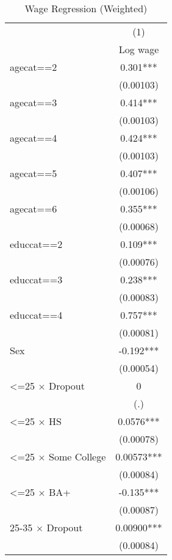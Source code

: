 
\begin{table}[htbp]\centering
\def\sym#1{\ifmmode^{#1}\else\(^{#1}\)\fi}
\caption{Wage Regression (Weighted)}
\footnotesize
\begin{tabular}{l*{1}{c}}
\toprule
                    &\multicolumn{1}{c}{(1)}\\
                    &\multicolumn{1}{c}{Log wage}\\
\midrule
agecat==2           &       0.301***\\
                    &   (0.00103)   \\
agecat==3           &       0.414***\\
                    &   (0.00103)   \\
agecat==4           &       0.424***\\
                    &   (0.00103)   \\
agecat==5           &       0.407***\\
                    &   (0.00106)   \\
agecat==6           &       0.355***\\
                    &   (0.00068)   \\
educcat==2          &       0.109***\\
                    &   (0.00076)   \\
educcat==3          &       0.238***\\
                    &   (0.00083)   \\
educcat==4          &       0.757***\\
                    &   (0.00081)   \\
Sex                 &      -0.192***\\
                    &   (0.00054)   \\
<=25 $\times$ Dropout&           0   \\
                    &         (.)   \\
<=25 $\times$ HS    &      0.0576***\\
                    &   (0.00078)   \\
<=25 $\times$ Some College&     0.00573***\\
                    &   (0.00084)   \\
<=25 $\times$ BA+   &      -0.135***\\
                    &   (0.00087)   \\
25-35 $\times$ Dropout&     0.00900***\\
                    &   (0.00084)   \\

\end{tabular}
\end{table}
